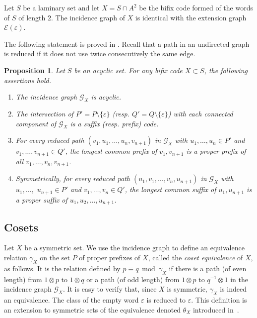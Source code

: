 \documentclass[preprint,12pt]{elsarticle}
\newtheorem{proposition}[theorem]{Proposition}
\newcommand\E{\mathcal{E}}
\newcommand\G{\mathcal{G}}
\numberwithin{theorem}{section}
\numberwithin{equation}{section}
\numberwithin{figure}{section}
\numberwithin{table}{section}
\begin{document}
\begin{example}
Let $S$ be a laminary set and let $X=S\cap A^2$ be the bifix code formed of the words of $S$ of length $2$.
The incidence graph of $X$ is identical with the extension graph $\E(\varepsilon)$.
\end{example}

The following statement is proved in \cite[Proposition 5.6]{BertheDeFeliceDolceLeroyPerrinReutenauerRindone2013a}.
Recall that a path in an undirected graph is reduced if it does not use twice consecutively the same edge.

\begin{proposition}
\label{proposition6.6}
Let $S$ be an acyclic set.
For any bifix code  $X\subset S$, the following assertions hold.
\begin{enumerate}
\item[\rm (i)] The incidence graph $\G_X$ is acyclic.
\item[\rm (ii)] The intersection of $P' = P\setminus\{\varepsilon\}$ (resp. $Q'=Q\setminus\{\varepsilon\}$) with each connected component of $\G_X$ is a suffix (resp. prefix) code.
\item[\rm (iii)] For every reduced path $(v_1,u_1,\ldots,u_n,v_{n+1})$ in $\G_X$ with $u_1,\ldots,u_n\in P'$ and $v_1,\ldots,v_{n+1}\in Q'$, the longest common prefix of $v_1,v_{n+1}$ is a proper prefix of all $v_1,\ldots,v_n,v_{n+1}$.
\item[\rm(iv)] Symmetrically, for every reduced path $(u_1,v_1,\ldots,v_n,u_{n+1})$ in $\G_X$ with $u_1,\ldots,$ $u_{n+1}\in P'$ and $v_1,\ldots,v_n\in Q'$, the longest common suffix of $u_1,u_{n+1}$ is a proper suffix of $u_1,u_2,\ldots,u_{n+1}$.
\end{enumerate}
\end{proposition}





\subsection{Cosets}
Let $X$ be a symmetric set.
We use the incidence graph to define an equivalence relation $\gamma_X$ on the set $P$ of proper prefixes of $X$, called the \emph{coset equivalence} of $X$, as follows. 
It is the relation defined by $p\equiv q\bmod \gamma_X$ if there is a path (of even length) from $1\otimes p$ to $1\otimes q$ or a path (of odd length) from $1\otimes p$ to $q^{-1}\otimes 1$ in the incidence graph $\G_X$.
It is easy to verify that, since $X$ is symmetric, $\gamma_X$
is indeed an equivalence. The class of the empty word $\varepsilon$
is reduced to $\varepsilon$.
  This definition is an extension
to symmetric sets of the equivalence denoted $\theta_X$
introduced in~\cite{BerstelDeFelicePerrinReutenauerRindone2012}.
\end{document}
